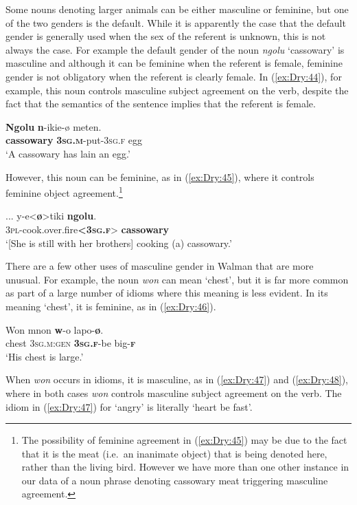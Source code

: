 \documentclass[output=collectionpaper]{langsci/langscibook}
\begin{document}
Some nouns denoting larger animals can be either masculine or feminine, but one of the two genders is the default. While it is apparently the case that the default gender is generally used when the sex of the referent is unknown, this is not always the case. For example the default gender of the noun \textit{ngolu} `cassowary' is masculine and although it can be feminine when the referent is female, feminine gender is not obligatory when the referent is clearly female. In (\ref{ex:Dry:44}), for example, this noun controls masculine subject agreement on the verb, despite the fact that the semantics of the sentence implies that the referent is female.

\ea \label{ex:Dry:44}
\gll \textbf{Ngolu}	\textbf{n}-ikie-ø	meten.\\
\textbf{cassowary} \textbf{\textsc{3sg.m}}-put-\textsc{3sg.f} egg\\
\glt `A cassowary has lain an egg.'
\z

However, this noun can be feminine, as in (\ref{ex:Dry:45}), where it controls feminine object agreement.\footnote{The possibility of feminine agreement in (\ref{ex:Dry:45}) may be due to the fact that it is the meat (i.e.\ an inanimate object) that is being denoted here, rather than the living bird. However we have more than one other instance in our data of a noun phrase denoting cassowary meat triggering masculine agreement.}

\ea \label{ex:Dry:45}
\gll ...	y-e<\textbf{ø}>tiki	\textbf{ngolu}.\\
{} \textsc{3pl}-cook.over.fire\textbf{<\textsc{3sg.f}}> \textbf{cassowary}\\
\glt `[She is still with her brothers] cooking (a) cassowary.'
\z

There are a few other uses of masculine gender in Walman that are more unusual. For example, the noun \textit{won} can mean `chest', but it is far more common as part of a large number of idioms where this meaning is less evident. In its meaning `chest', it is feminine, as in (\ref{ex:Dry:46}).

\ea \label{ex:Dry:46}
\gll Won	mnon	\textbf{w}-o	lapo-\textbf{ø}.\\
chest \textsc{3sg.m:gen} \textbf{\textsc{3sg.f}}-be big-\textbf{\textsc{f}}\\
\glt `His chest is large.'
\z

When \textit{won} occurs in idioms, it is masculine, as in (\ref{ex:Dry:47}) and (\ref{ex:Dry:48}), where in both cases \textit{won} controls masculine subject agreement on the verb. The idiom in (\ref{ex:Dry:47}) for `angry' is literally `heart be fast'.
\end{document}
